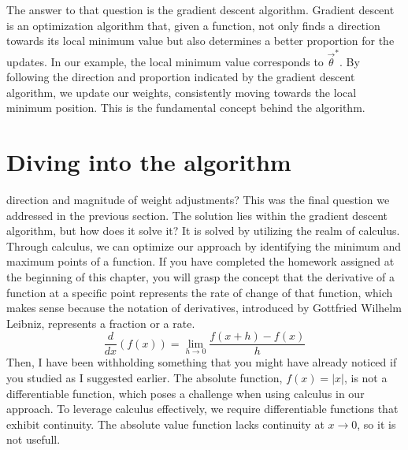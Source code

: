 \begin{center}
\end{center}
The answer to that question is the gradient descent algorithm. Gradient descent is an optimization algorithm
that, given a function, not only finds a direction towards its local minimum value but also determines a better
proportion for the updates. In our example, the local minimum value corresponds to $\vec{\theta}^*$. By following
the direction and proportion
indicated by the gradient descent algorithm, we update our weights, consistently moving towards the
local minimum position. This is the fundamental concept behind the algorithm.

\section{Diving into the algorithm}
\label{sec:diving_into_the_algorithm}
direction and magnitude of weight adjustments? This was the final question we addressed in the previous
section. The solution lies within the gradient descent algorithm, but how does it solve it? It is solved by
utilizing the realm of calculus. Through calculus, we can optimize our approach by identifying the minimum
and maximum points of a function. If you have completed the homework assigned at the beginning of this
chapter, you will grasp the concept that the derivative of a function at a specific point represents the
rate of change of that function, which makes sense because the notation of derivatives, introduced by
Gottfried Wilhelm Leibniz, represents a fraction or a rate.
\[
\frac{d}{dx}(f(x)) = \lim_{h \rightarrow 0}\frac{f(x + h) - f(x)}{h}
\]
Then, I have been withholding something that you might have already noticed if you studied as I suggested
earlier. The absolute function, $f(x) = |x|$, is not a differentiable function, which poses a challenge when
using calculus in our approach. To leverage calculus effectively, we require differentiable functions that
exhibit continuity. The absolute value function lacks continuity at $x \rightarrow 0$, so it is not
usefull.\\


